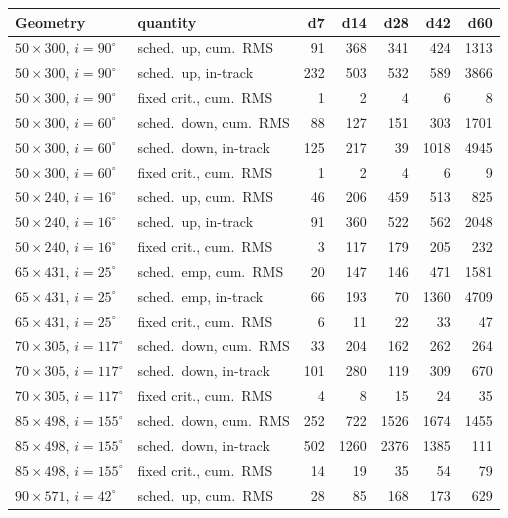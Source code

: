 \begin{tabular}{@{}l l r r r r r @{}}
\toprule
Geometry & quantity & d7 & d14 & d28 & d42 & d60 \\
\midrule
$50\times300$, $i=90^\circ$ & sched.\ up, cum.\ RMS & 91 & 368 & 341 & 424 & 1313 \\
$50\times300$, $i=90^\circ$ & sched.\ up, in-track & 232 & 503 & 532 & 589 & 3866 \\
$50\times300$, $i=90^\circ$ & fixed crit., cum.\ RMS & 1 & 2 & 4 & 6 & 8 \\
\addlinespace[2pt]
$50\times300$, $i=60^\circ$ & sched.\ down, cum.\ RMS & 88 & 127 & 151 & 303 & 1701 \\
$50\times300$, $i=60^\circ$ & sched.\ down, in-track & 125 & 217 & 39 & 1018 & 4945 \\
$50\times300$, $i=60^\circ$ & fixed crit., cum.\ RMS & 1 & 2 & 4 & 6 & 9 \\
\addlinespace[2pt]
$50\times240$, $i=16^\circ$ & sched.\ up, cum.\ RMS & 46 & 206 & 459 & 513 & 825 \\
$50\times240$, $i=16^\circ$ & sched.\ up, in-track & 91 & 360 & 522 & 562 & 2048 \\
$50\times240$, $i=16^\circ$ & fixed crit., cum.\ RMS & 3 & 117 & 179 & 205 & 232 \\
\addlinespace[2pt]
$65\times431$, $i=25^\circ$ & sched.\ emp, cum.\ RMS & 20 & 147 & 146 & 471 & 1581 \\
$65\times431$, $i=25^\circ$ & sched.\ emp, in-track & 66 & 193 & 70 & 1360 & 4709 \\
$65\times431$, $i=25^\circ$ & fixed crit., cum.\ RMS & 6 & 11 & 22 & 33 & 47 \\
\addlinespace[2pt]
$70\times305$, $i=117^\circ$ & sched.\ down, cum.\ RMS & 33 & 204 & 162 & 262 & 264 \\
$70\times305$, $i=117^\circ$ & sched.\ down, in-track & 101 & 280 & 119 & 309 & 670 \\
$70\times305$, $i=117^\circ$ & fixed crit., cum.\ RMS & 4 & 8 & 15 & 24 & 35 \\
\addlinespace[2pt]
$85\times498$, $i=155^\circ$ & sched.\ down, cum.\ RMS & 252 & 722 & 1526 & 1674 & 1455 \\
$85\times498$, $i=155^\circ$ & sched.\ down, in-track & 502 & 1260 & 2376 & 1385 & 111 \\
$85\times498$, $i=155^\circ$ & fixed crit., cum.\ RMS & 14 & 19 & 35 & 54 & 79 \\
\addlinespace[2pt]
$90\times571$, $i=42^\circ$ & sched.\ up, cum.\ RMS & 28 & 85 & 168 & 173 & 629 \\

\end{tabular}
